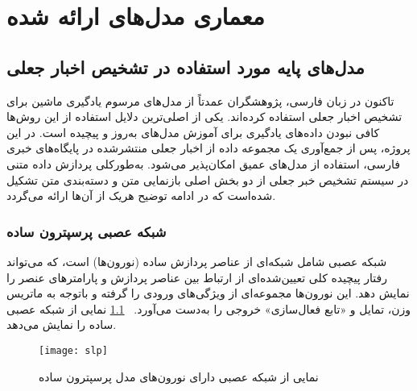 \chapter{معماری مدل‌های ارائه شده}
\section{مدل‌های پایه مورد استفاده در تشخیص اخبار جعلی}
تاکنون در زبان فارسی، پژوهشگران عمدتاً از مدل‌های مرسوم یادگیری ماشین برای تشخیص اخبار جعلی استفاده کرده‌اند. یکی از اصلی‌ترین دلایل استفاده از این روش‌ها کافی نبودن داده‌های یادگیری برای آموزش مدل‌های به‌روز و پیچیده است. در این پروژه، پس از جمع‌آوری یک مجموعه داده از اخبار جعلی منتشرشده در پایگاه‌های خبری فارسی، استفاده از مدل‌های عمیق امکان‌پذیر می‌شود. به‌طورکلی پردازش داده متنی در سیستم تشخیص خبر جعلی‌ از دو بخش اصلی بازنمایی متن و دسته‌بندی متن تشکیل شده‌است که در ادامه توضیح هریک از آن‌ها ارائه می‌گردد.
\subsection{شبکه عصبی پرسپترون ساده}
شبکه عصبی شامل شبکه‌ای از عناصر پردازش ساده (نورون‌ها) است، که می‌تواند رفتار پیچیده کلی تعیین‌شده‌ای از ارتباط بین عناصر پردازش و پارامترهای عنصر را نمایش دهد. این نورون‌ها مجموعه‌ای از ویژگی‌های ورودی را گرفته و باتوجه‌ به ماتریس وزن، تمایل و «تابع فعال‌سازی» خروجی را به‌دست می‌آورد. \figurename~\ref{fig.slp} نمایی از شبکه عصبی ساده را نمایش می‌دهد.

\begin{figure}[!h]
\texttt{[image: slp]}
\centering
\caption{نمایی از شبکه عصبی دارای نورون‌های مدل پرسپترون ساده}
\label{fig.slp}
\end{figure}


